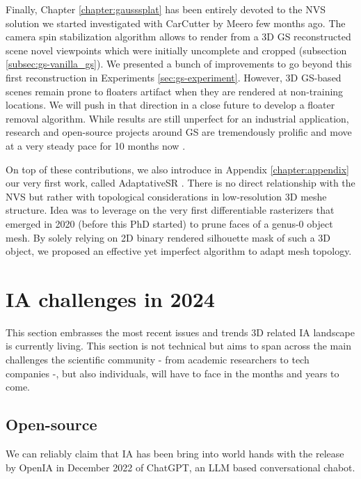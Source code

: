 Finally, Chapter \ref{chapter:gausssplat} has been entirely devoted to the \ac{NVS} solution we started investigated with CarCutter by Meero few months ago. The camera spin stabilization algorithm allows to render from a 3D \ac{GS} reconstructed scene novel viewpoints which were initially uncomplete and cropped (subsection \ref{subsec:gs-vanilla_gs}). We presented a bunch of improvements to go beyond this first reconstruction in Experiments \ref{sec:gs-experiment}. However, 3D \ac{GS}-based scenes remain prone to floaters artifact when they are rendered at non-training locations. We will push in that direction in a close future to develop a floater removal algorithm. While results are still unperfect for an industrial application, research and open-source projects around \ac{GS} \citep{kerbl20233d} are tremendously prolific and move at a very steady pace for 10 months now \citep{luiten2023dynamic,yang2024gaussianobject,wewer24latentsplat}. 

On top of these contributions, we also introduce in Appendix \ref{chapter:appendix} our very first work, called AdaptativeSR \citep{landreau2022adaptativesr}. There is no direct relationship with the \ac{NVS} but rather with topological considerations in low-resolution 3D meshe structure. Idea was to leverage on the very first differentiable rasterizers that emerged in 2020 \cite{liu2019soft} (before this PhD started) to prune faces of a genus-0 object mesh. By solely relying on 2D binary rendered silhouette mask of such a 3D object, we proposed an effective yet imperfect algorithm to adapt mesh topology. 

\section{IA challenges in 2024}

This section embrasses the most recent issues and trends 3D related \ac{IA} landscape is currently living. This section is not technical but aims to span across the main challenges the scientific community - from academic researchers to tech companies -, but also individuals, will have to face in the months and years to come. 

\subsection{Open-source}
We can reliably claim that \ac{IA} has been bring into world hands with the release by OpenIA in December 2022 of ChatGPT, an \ac{LLM} based conversational chabot. 

